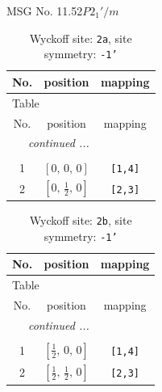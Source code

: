 \documentclass[fleqn,8pt]{jsarticle}
\begin{document}
\setcounter{MaxMatrixCols}{32}

\renewcommand{\tablename}{Table~}
\renewcommand{\figurename}{Figure~}
\begin{center}
\LARGE
MSG No. 11.52\quad$P2_{1}'/m$
\end{center}
\renewcommand{\arraystretch}{1.2}
\begin{longtable}{ccc}
\caption{Wyckoff site: {\tt 2a}, site symmetry: {\tt -1'}}
 \\
 \hline \hline
No. & position & mapping \\ \hline \endfirsthead

\multicolumn{2}{l}{\tablename\ \thetable{}} \\
 \hline \hline
No. & position & mapping \\ \hline \endhead

 \hline \hline
\multicolumn{2}{r}{\footnotesize\it continued ...} \\ \endfoot

 \hline \hline
\multicolumn{2}{r}{} \\ \endlastfoot

1 & $\left[ 0,\, 0,\, 0 \right]$ & {\tt [1,4]} \\ \hline
2 & $\left[ 0,\, \frac{1}{2},\, 0 \right]$ & {\tt [2,3]} \\
\end{longtable}
\renewcommand{\arraystretch}{1.2}
\begin{longtable}{ccc}
\caption{Wyckoff site: {\tt 2b}, site symmetry: {\tt -1'}}
 \\
 \hline \hline
No. & position & mapping \\ \hline \endfirsthead

\multicolumn{2}{l}{\tablename\ \thetable{}} \\
 \hline \hline
No. & position & mapping \\ \hline \endhead

 \hline \hline
\multicolumn{2}{r}{\footnotesize\it continued ...} \\ \endfoot

 \hline \hline
\multicolumn{2}{r}{} \\ \endlastfoot

1 & $\left[ \frac{1}{2},\, 0,\, 0 \right]$ & {\tt [1,4]} \\ \hline
2 & $\left[ \frac{1}{2},\, \frac{1}{2},\, 0 \right]$ & {\tt [2,3]} \\
\end{longtable}
\renewcommand{\arraystretch}{1.2}
\end{document}
